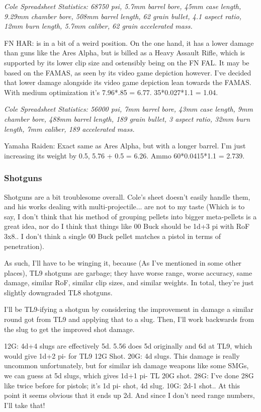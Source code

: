 \begin{multicols*}{2}
	\textit{\textcolor{OliveGreen}{Cole Spreadsheet Statistics: 68750 psi, 5.7mm barrel bore, 45mm case length, 9.29mm chamber bore, 508mm barrel length, 62 grain bullet, 4.1 aspect ratio, 12mm burn length, 5.7mm caliber, 62 grain accelerated mass.}}
	
	FN HAR: is in a bit of a weird position. On the one hand, it has a lower damage than guns like the Ares Alpha, but is billed as a Heavy Assault Rifle, which is supported by its lower clip size and ostensibly being on the FN FAL. It may be based on the FAMAS, as seen by its video game depiction however. I've decided that lower damage alongside its video game depiction lean towards the FAMAS. With medium optimization it's 7.96*.85 = 6.77. 35*0.027*1.1 = 1.04.
	
	\textit{\textcolor{OliveGreen}{Cole Spreadsheet Statistics:  56000 psi, 7mm barrel bore, 43mm case length, 9mm chamber bore, 488mm barrel length, 189 grain bullet, 3 aspect ratio, 32mm burn length, 7mm caliber, 189 accelerated mass.}}
	
	Yamaha Raiden: Exact same as Ares Alpha, but with a longer barrel. I'm just increasing its weight by 0.5, 5.76 + 0.5 = 6.26. Ammo 60*0.0415*1.1 = 2.739.
	
	\subsubsection{Shotguns}
	
	Shotguns are a bit troublesome overall. Cole's sheet doesn't easily handle them, and his works dealing with multi-projectile... are not to my taste (Which is to say, I don't think that his method of grouping pellets into bigger meta-pellets is a great idea, nor do I think that things like 00 Buck should be 1d+3 pi with RoF 3x8.. I don't think a single 00 Buck pellet matches a pistol in terms of penetration). 
	
	As such, I'll have to be winging it, because (As I've mentioned in some other places), TL9 shotguns are garbage; they have worse range, worse accuracy, same damage, similar RoF, similar clip sizes, and similar weights. In total, they're just slightly downgraded TL8 shotguns. 
	
	I'll be TL9-ifying a shotgun by considering the improvement in damage a similar round got from TL9 and applying that to a slug. Then, I'll work backwards from the slug to get the improved shot damage. 
	
	12G: 4d+4 slugs are effectively 5d. 5.56 does 5d originally and 6d at TL9, which would give 1d+2 pi- for TL9 12G Shot.
	20G: 4d slugs. This damage is really uncommon unfortunately, but for similar ish damage weapons like some SMGs, we can guess at 5d slugs, which gives 1d+1 pi- TL 20G shot.
	28G: I've done 28G like twice before for pistols; it's 1d pi- shot, 4d slug.
	10G: 2d-1 shot.. At this point it seems obvious that it ends up 2d. And since I don't need range numbers, I'll take that!
	

\end{multicols*}
